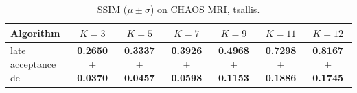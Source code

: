 \begin{table}[htbp]
\centering
\caption{SSIM ($\mu \pm \sigma$) on CHAOS MRI, tsallis.}
\label{tab:exp2-tsallis-ssim}
\begin{tabular}{lcccccc}
\toprule
Algorithm & $K=3$ & $K=5$ & $K=7$ & $K=9$ & $K=11$ & $K=12$ \\
\midrule
late acceptance de & \textbf{0.2650 $\pm$ 0.0370} & \textbf{0.3337 $\pm$ 0.0457} & \textbf{0.3926 $\pm$ 0.0598} & \textbf{0.4968 $\pm$ 0.1153} & \textbf{0.7298 $\pm$ 0.1886} & \textbf{0.8167 $\pm$ 0.1745} \\
\bottomrule
\end{tabular}
\end{table}